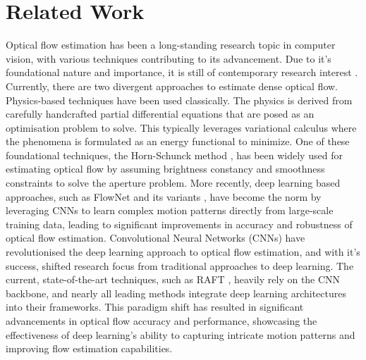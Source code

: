 \section{Related Work}\label{sec:related}

\IEEEPARstart{}{} Optical flow estimation has been a long-standing research topic in computer vision, with various techniques contributing to its advancement. Due to it's foundational nature and importance, it is still of contemporary research interest \cite{xu2022gmflow,teed2020raft,shi2023flowformer++, saxena2024surprising}. Currently, there are two divergent approaches to estimate dense optical flow. Physics-based techniques have been used classically. The physics is derived from carefully handcrafted partial differential equations that are posed as an optimisation problem to solve. This typically leverages variational calculus where the phenomena is formulated as an energy functional to minimize. One of these foundational techniques, the Horn-Schunck method \cite{horn1981determining}, has been widely used for estimating optical flow by assuming brightness constancy and smoothness constraints to solve the aperture problem. 
\IEEEPARstart{}{} More recently, deep learning based approaches, such as FlowNet and its variants \cite{dosovitskiy2015flownet, ilg2017flownet, hui2018liteflownet, sun2018pwc}, have become the norm by leveraging CNNs to learn complex motion patterns directly from large-scale training data, leading to significant improvements in accuracy and robustness of optical flow estimation. Convolutional Neural Networks (CNNs) have revolutionised the deep learning approach to optical flow estimation, and with it's success, shifted research focus from traditional approaches to deep learning. The current, state-of-the-art techniques, such as RAFT \cite{teed2020raft}, heavily rely on the CNN backbone, and nearly all leading methods integrate deep learning architectures into their frameworks. This paradigm shift has resulted in significant advancements in optical flow accuracy and performance, showcasing the effectiveness of deep learning's ability to capturing intricate motion patterns and improving flow estimation capabilities. 
